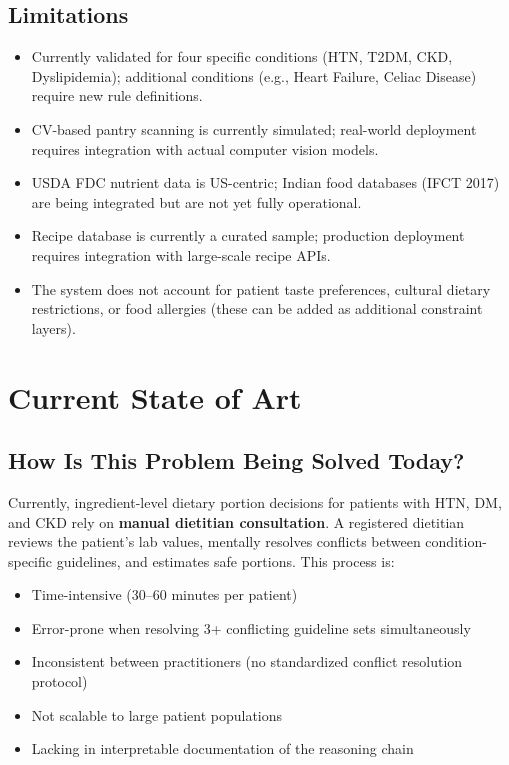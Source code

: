 \documentclass[a4paper,12pt]{article}
\begin{document}
\subsection*{Limitations}
\begin{itemize}[itemsep=0.3em]
    \item Currently validated for four specific conditions (HTN, T2DM, CKD, Dyslipidemia); additional conditions (e.g., Heart Failure, Celiac Disease) require new rule definitions.
    \item CV-based pantry scanning is currently simulated; real-world deployment requires integration with actual computer vision models.
    \item USDA FDC nutrient data is US-centric; Indian food databases (IFCT 2017) are being integrated but are not yet fully operational.
    \item Recipe database is currently a curated sample; production deployment requires integration with large-scale recipe APIs.
    \item The system does not account for patient taste preferences, cultural dietary restrictions, or food allergies (these can be added as additional constraint layers).
\end{itemize}

\section*{Current State of Art}

\subsection*{How Is This Problem Being Solved Today?}
Currently, ingredient-level dietary portion decisions for patients with HTN, DM, and CKD rely on \textbf{manual dietitian consultation}. A registered dietitian reviews the patient's lab values, mentally resolves conflicts between condition-specific guidelines, and estimates safe portions. This process is:
\begin{itemize}
    \item Time-intensive (30--60 minutes per patient)
    \item Error-prone when resolving 3+ conflicting guideline sets simultaneously
    \item Inconsistent between practitioners (no standardized conflict resolution protocol)
    \item Not scalable to large patient populations
    \item Lacking in interpretable documentation of the reasoning chain
\end{itemize}
\end{document}
